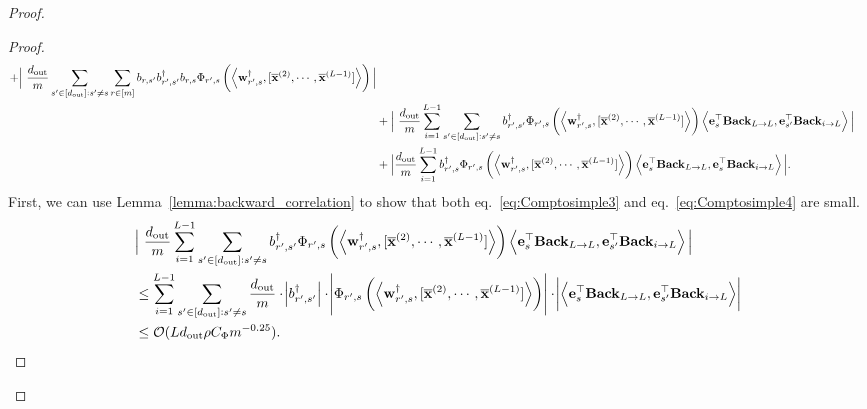 \begin{claim}
\begin{proof}
\begin{proof}
\begin{align}
					+ \Big| \ \frac{d_{\mathrm{out}} }{m} \sum_{s'\in [d_{\mathrm{out}} ]: s' \ne s} \sum_{r \in [m]}  b_{r, s'} b_{r', s'}^{\dagger} b_{r, s} \Phi_{r', s} \left(\left\langle \mathbf{w}_{r', s}^{\dagger}, [\overline{\mathbf{x}}^{(2)}, \cdots, \overline{\mathbf{x}}^{(L-1)}]\right\rangle\right) \Big| \label{eq:Comptosimple2}\\&
					+ \Big| \ \frac{d_{\mathrm{out}} }{m}  \sum_{i=1}^{L-1} \sum_{s'\in [d_{\mathrm{out}} ]: s' \ne s}  b_{r', s'}^{\dagger} \Phi_{r', s} \left(\left\langle \mathbf{w}_{r', s}^{\dagger}, [\overline{\mathbf{x}}^{(2)}, \cdots, \overline{\mathbf{x}}^{(L-1)}]\right\rangle\right) \left\langle \mathbf{e}_s^{\top} \mathbf{Back}_{L \to L}, \mathbf{e}_{s'}^{\top} \mathbf{Back}_{i \to L} \right\rangle  \Big| \label{eq:Comptosimple3}\\&
					+ \Big|  \frac{d_{\mathrm{out}} }{m} \sum_{i=1}^{L-1}  b_{r', s}^{\dagger} \Phi_{r', s} \left(\left\langle \mathbf{w}_{r', s}^{\dagger}, [\overline{\mathbf{x}}^{(2)}, \cdots, \overline{\mathbf{x}}^{(L-1)}]\right\rangle\right) \left\langle \mathbf{e}_s^{\top} \mathbf{Back}_{L \to L}, \mathbf{e}_s^{\top} \mathbf{Back}_{i \to L} \right\rangle  \Big| \label{eq:Comptosimple4}.
				\end{align}
				\endgroup
				First, we can use Lemma~\ref{lemma:backward_correlation} to show that both eq.~\ref{eq:Comptosimple3} and eq.~\ref{eq:Comptosimple4} are small.
				\begin{align*}
					&\Big| \ \frac{d_{\mathrm{out}} }{m}  \sum_{i=1}^{L-1} \sum_{s'\in [d_{\mathrm{out}} ]: s' \ne s}  b_{r', s'}^{\dagger} \Phi_{r', s} \left(\left\langle \mathbf{w}_{r', s}^{\dagger}, [\overline{\mathbf{x}}^{(2)}, \cdots, \overline{\mathbf{x}}^{(L-1)}]\right\rangle\right) \left\langle \mathbf{e}_s^{\top} \mathbf{Back}_{L \to L}, \mathbf{e}_{s'}^{\top} \mathbf{Back}_{i \to L} \right\rangle  \Big| \\&
					\le \sum_{i=1}^{L-1} \sum_{s'\in [d_{\mathrm{out}} ]: s' \ne s} \frac{d_{\mathrm{out}} }{m} \cdot \abs{b_{r', s'}^{\dagger}} \cdot \abs{\Phi_{r', s} \left(\left\langle \mathbf{w}_{r', s}^{\dagger}, [\overline{\mathbf{x}}^{(2)}, \cdots, \overline{\mathbf{x}}^{(L-1)}]\right\rangle\right)} \cdot \abs{\left\langle \mathbf{e}_s^{\top} \mathbf{Back}_{L \to L}, \mathbf{e}_{s'}^{\top} \mathbf{Back}_{i \to L} \right\rangle } \\& \le  \mathcal{O}(Ld_{\mathrm{out}} \rho C_{\Phi} m^{-0.25}).
				\end{align*}
				

\end{proof}
\end{proof}
\end{claim}
